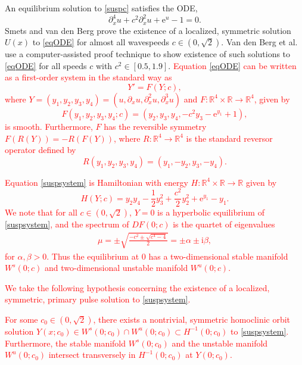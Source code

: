 \documentclass[review,onefignum,onetabnum]{siamart171218}
\newcommand{\R}{\mathbb{R}}
\newcommand{\rme}{\mathrm{e}}
\newcommand{\rmi}{\mathrm{i}}
\newcommand{\revised}[1]{ \textcolor{red}{#1} }
\begin{document}
An equilibrium solution to \cref{suspc} satisfies the ODE,
\begin{equation}\label{eqODE}
\partial_x^4u +  c^2\partial_x^2u + \rme^{u} - 1 = 0.
\end{equation}
Smets and van den Berg \cite[Theorem 11]{Smets2002} prove the existence of a localized, symmetric solution $U(x)$ to \cref{eqODE} for almost all wavespeeds $c \in (0, \sqrt{2})$. Van den Berg et al. \cite[Theorem~1]{Berg2018} use a computer-assisted proof technique to show existence of such solutions to \cref{eqODE} for all speeds $c$ with $c^2 \in [0.5, 1.9]$.
\revised{
Equation \cref{eqODE} can be written as a first-order system in the standard way as
\begin{equation}\label{suspsystem}
Y' = F(Y; c),
\end{equation}
where $Y = (y_1, y_2, y_3, y_4) = (u, \partial_x u, \partial_x^2 u, \partial_x^3 u)$ and $F: \R^4 \times \R \rightarrow \R^4$, given by
\begin{equation}\label{suspF}
F(y_1, y_2, y_3, y_4; c) = (y_2, y_3, y_4, -c^2 y_3 - \rme^{y_1} + 1),
\end{equation}
is smooth. Furthermore, $F$ has the reversible symmetry $F(R(Y)) = -R(F(Y))$, where $R: \R^4 \rightarrow \R^4$ is the standard reversor operator defined by
\[
R(y_1, y_2, y_3, y_4) = (y_1, -y_2, y_3, -y_4).
\]
}

\revised{
Equation \cref{suspsystem} is Hamiltonian with energy $H:\R^4 \times \R \rightarrow \R$ given by
\begin{equation}\label{suspH}
H(Y; c) = y_2 y_4 - \frac{1}{2}y_3^2 + \frac{c^2}{2}y_2^2 + \rme^{y_1} - y_1.
\end{equation}
We note that for all $c \in (0, \sqrt{2})$, $Y = 0$ is a hyperbolic equilibrium of \cref{suspsystem}, and the spectrum of $DF(0; c)$ is the quartet of eigenvalues
\begin{align}\label{specA00}
\mu = \pm \sqrt{\frac{-c^2 \pm \sqrt{c^4 - 4}}{2} } = \pm \alpha \pm \rmi\beta,
\end{align}
for $\alpha, \beta > 0$. Thus the equilibrium at 0 has a two-dimensional stable manifold $W^s(0; c)$ and two-dimensional unstable manifold $W^u(0; c)$.
}

\revised{
We take the following hypothesis concerning the existence of a localized, symmetric, primary pulse solution to \cref{suspsystem}.
\begin{hypothesis}\label{Uexistshyp}
For some $c_0 \in (0, \sqrt{2})$, there exists a nontrivial, symmetric homoclinic orbit solution $Y(x; c_0) \in W^s(0; c_0) \cap W^u(0; c_0) \subset H^{-1}(0; c_0)$ to \cref{suspsystem}. Furthermore, the stable manifold $W^s(0; c_0)$ and the unstable manifold $W^u(0; c_0)$ intersect transversely in $H^{-1}(0; c_0)$ at $Y(0; c_0)$.
\end{hypothesis}
}
\end{document}
